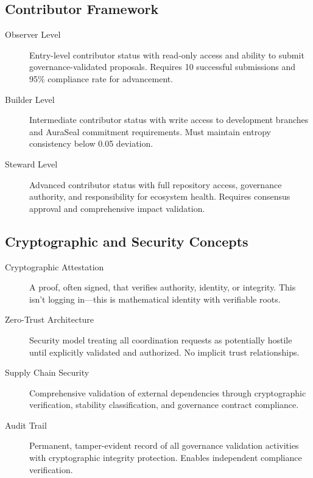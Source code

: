 \subsection*{Contributor Framework}

\begin{description}
\item[Observer Level] Entry-level contributor status with read-only access and ability to submit governance-validated proposals. Requires 10 successful submissions and 95\% compliance rate for advancement.

\item[Builder Level] Intermediate contributor status with write access to development branches and AuraSeal commitment requirements. Must maintain entropy consistency below 0.05 deviation.

\item[Steward Level] Advanced contributor status with full repository access, governance authority, and responsibility for ecosystem health. Requires consensus approval and comprehensive impact validation.
\end{description}

\subsection*{Cryptographic and Security Concepts}

\begin{description}
\item[Cryptographic Attestation] A proof, often signed, that verifies authority, identity, or integrity. This isn't logging in—this is mathematical identity with verifiable roots.

\item[Zero-Trust Architecture] Security model treating all coordination requests as potentially hostile until explicitly validated and authorized. No implicit trust relationships.

\item[Supply Chain Security] Comprehensive validation of external dependencies through cryptographic verification, stability classification, and governance contract compliance.

\item[Audit Trail] Permanent, tamper-evident record of all governance validation activities with cryptographic integrity protection. Enables independent compliance verification.
\end{description}

